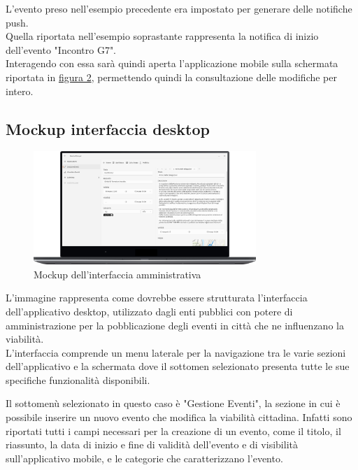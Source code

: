 \documentclass{article}
\begin{document}
L'evento preso nell'esempio precedente era impostato per generare delle notifiche push.\\
Quella riportata nell'esempio soprastante rappresenta la notifica di inizio dell'evento "Incontro G7".\\
Interagendo con essa sarà quindi aperta l'applicazione mobile sulla schermata riportata in \hyperref[fig:Dettaglio_evento]{figura 2}, permettendo quindi la consultazione delle modifiche per intero.\\

\clearpage

\subsection{Mockup interfaccia desktop}
\begin{figure}[htbp]
    \label{fig:Schermata_principale_desktop}
    \centering
    \includegraphics[width=0.75\textwidth]{Images/Mockup1 - Desktop.png}
    \caption{Mockup dell'interfaccia amministrativa}
\end{figure}

L'immagine rappresenta come dovrebbe essere strutturata l'interfaccia dell'applicativo desktop, utilizzato dagli enti pubblici con potere di amministrazione per la pobblicazione degli eventi in città che ne influenzano la viabilità.\\
L'interfaccia comprende un menu laterale per la navigazione tra le varie sezioni dell'applicativo e la schermata dove il sottomen selezionato presenta tutte le sue specifiche funzionalità disponibili.

Il sottomenù selezionato in questo caso è "Gestione Eventi", la sezione in cui è possibile inserire un nuovo evento che modifica la viabilità cittadina. Infatti sono riportati tutti i campi necessari per la creazione di un evento, come il titolo, il riassunto, la data di inizio e fine di validità dell'evento e di visibilità sull'applicativo mobile, e le categorie che caratterizzano l'evento.
\end{document}
